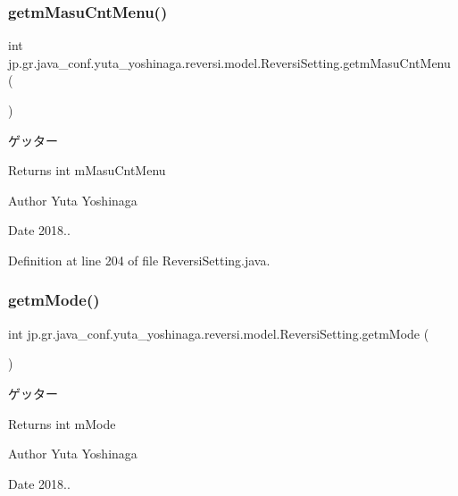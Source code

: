 \subsubsection{\texorpdfstring{getm\+Masu\+Cnt\+Menu()}{getmMasuCntMenu()}}
{\footnotesize\ttfamily int jp.\+gr.\+java\+\_\+conf.\+yuta\+\_\+yoshinaga.\+reversi.\+model.\+Reversi\+Setting.\+getm\+Masu\+Cnt\+Menu (\begin{DoxyParamCaption}{ }\end{DoxyParamCaption})}



ゲッター 

\begin{DoxyReturn}{Returns}
int m\+Masu\+Cnt\+Menu 
\end{DoxyReturn}
\begin{DoxyAuthor}{Author}
Yuta Yoshinaga 
\end{DoxyAuthor}
\begin{DoxyDate}{Date}
2018.. 
\end{DoxyDate}


Definition at line 204 of file Reversi\+Setting.\+java.

\mbox{\label{classjp_1_1gr_1_1java__conf_1_1yuta__yoshinaga_1_1reversi_1_1model_1_1_reversi_setting_a692b0ca2802f35aa7404c38bfe2fdb02}} 
\subsubsection{\texorpdfstring{getm\+Mode()}{getmMode()}}
{\footnotesize\ttfamily int jp.\+gr.\+java\+\_\+conf.\+yuta\+\_\+yoshinaga.\+reversi.\+model.\+Reversi\+Setting.\+getm\+Mode (\begin{DoxyParamCaption}{ }\end{DoxyParamCaption})}



ゲッター 

\begin{DoxyReturn}{Returns}
int m\+Mode 
\end{DoxyReturn}
\begin{DoxyAuthor}{Author}
Yuta Yoshinaga 
\end{DoxyAuthor}
\begin{DoxyDate}{Date}
2018.. 
\end{DoxyDate}


